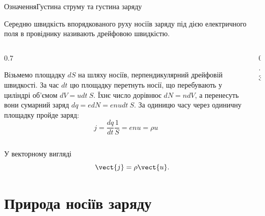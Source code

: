 \documentclass[onlytextwidth]{beamer}
\begin{document}
\begin{frame}{Означення}{Густина струму та густина заряду}
	\begin{block}{}\justifying
		Середню швидкість впорядкованого руху носіїв заряду під дією електричного поля в провіднику
		називають \alert{дрейфовою швидкістю}.
	\end{block}


	\begin{columns}
		\begin{column}{0.7\linewidth}
			\begin{block}{}\justifying
				Візьмемо площадку $dS$ на шляху носіїв, перпендикулярний дрейфовій швидкості. За час $dt$ цю
				площадку перетнуть носії, що перебувають у циліндрі об'ємом $dV = udt\ S$. Їхнє
				число дорівнює
				$dN = ndV$, а перенесуть вони сумарний заряд $dq = e dN = enudt\ S$. За одиницю часу
				через одиничну площадку пройде заряд:
				\begin{equation*}
					j = \frac{dq}{dt}\frac1S = enu = \rho u
				\end{equation*}
			\end{block}
		\end{column}
		\begin{column}{0.3\linewidth}\centering
			
		\end{column}
	\end{columns}
	\begin{block}{}
		У векторному вигляді
		\begin{equation*}
			\vect{j} = \rho\vect{u}.
		\end{equation*}
	\end{block}
\end{frame}




\section{Природа носіїв заряду}
\end{document}
